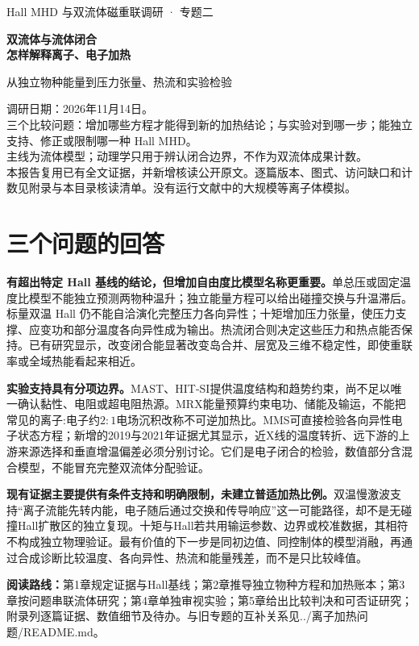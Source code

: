 \documentclass[UTF8,a4paper,11pt,openany,fontset=fandol]{ctexbook}
\begin{document}
\frontmatter
\begin{titlepage}
\vspace*{16mm}
{\sffamily\Large Hall MHD 与双流体磁重联调研 · 专题二\par}
\vspace{12mm}
{\sffamily\Huge\bfseries\color{ink}双流体与流体闭合\\[8pt]怎样解释离子、电子加热\par}
\vspace{12mm}
{\Large 从独立物种能量到压力张量、热流和实验检验\par}
\vfill
调研日期：2026年11月14日。\\[7pt]
三个比较问题：增加哪些方程才能得到新的加热结论；与实验对到哪一步；能独立支持、修正或限制哪一种 Hall MHD。\\[7pt]
主线为流体模型；动理学只用于辨认闭合边界，不作为双流体成果计数。\\[7pt]
本报告复用已有全文证据，并新增核读公开原文。逐篇版本、图式、访问缺口和计数见附录与本目录核读清单。没有运行文献中的大规模等离子体模拟。
\end{titlepage}
\chapter*{三个问题的回答}
\textbf{有超出特定 Hall 基线的结论，但增加自由度比模型名称更重要。}单总压或固定温度比模型不能独立预测两物种温升；独立能量方程可以给出碰撞交换与升温滞后。标量双温 Hall 仍不能自洽演化完整压力各向异性；十矩增加压力张量，使压力支撑、应变功和部分温度各向异性成为输出。热流闭合则决定这些压力和热点能否保持。已有研究显示，改变闭合能显著改变岛合并、层宽及三维不稳定性，即使重联率或全域热能看起来相近。\citep{L164,Wang2015,Ng2017,Ng2020,TenBarge2019MMS,Closure2026}

\textbf{实验支持具有分项边界。}MAST、HIT-SI提供温度结构和趋势约束，尚不足以唯一确认黏性、电阻或超电阻热源。MRX能量预算约束电功、储能及输运，不能把常见的离子:电子约$2:1$电场沉积改称不可逆加热比。MMS可直接检验各向异性电子状态方程；新增的2019与2021年证据尤其显示，近X线的温度转折、远下游的上游来源选择和垂直增温偏差必须分别讨论。它们是电子闭合的检验，数值部分含混合模型，不能冒充完整双流体分配验证。\citep{Tanabe2015MAST,Kaptanoglu2020,F674,Wetherton2019,Wetherton2021}

\textbf{现有证据主要提供有条件支持和明确限制，未建立普适加热比例。}双温慢激波支持“离子流能先转内能，电子随后通过交换和传导响应”这一可能路径，却不是无碰撞Hall扩散区的独立复现。十矩与Hall若共用输运参数、边界或校准数据，其相符不构成独立物理验证。最有价值的下一步是同初边值、同控制体的模型消融，再通过合成诊断比较温度、各向异性、热流和能量残差，而不是只比较峰值。

\textbf{阅读路线：}第1章规定证据与Hall基线；第2章推导独立物种方程和加热账本；第3章按问题串联流体研究；第4章单独审视实验；第5章给出比较判决和可否证研究；附录列逐篇证据、数值细节及待办。与旧专题的互补关系见\textsf{../离子加热问题/README.md}。
\begingroup\small\setcounter{tocdepth}{2}\tableofcontents\endgroup
\mainmatter





\appendix

\backmatter


\end{document}
